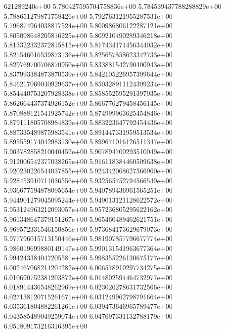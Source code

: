 621289240e+00	5.780427595704758836e+00	5.784539437788288829e+00	5.788651279871758426e+00	5.792763121955287531e+00	5.796874964038817524e+00	5.800986806122287121e+00	5.805098648205816225e+00	5.809210490289346218e+00	5.813322332372815815e+00	5.817434174456344032e+00	5.821546016539873136e+00	5.825657858623342733e+00	5.829769700706870950e+00	5.833881542790400943e+00	5.837993384873870539e+00	5.842105226957399644e+00	5.846217069040929637e+00	5.850328911124399234e+00	5.854440753207928338e+00	5.858552595291397935e+00	5.862664437374926152e+00	5.866776279458456145e+00	5.870888121541925742e+00	5.874999963625454846e+00	5.879111805708984839e+00	5.883223647792454436e+00	5.887335489875983541e+00	5.891447331959513534e+00	5.895559174042983130e+00	5.899671016126511347e+00	5.903782858210040452e+00	5.907894700293510049e+00	5.912006542377038265e+00	5.916118384460509638e+00	5.920230226544037855e+00	5.924342068627566960e+00	5.928453910711036556e+00	5.932565752794566549e+00	5.936677594878095654e+00	5.940789436961565251e+00	5.944901279045095244e+00	5.949013121128622572e+00	5.953124963212093057e+00	5.957236805295622162e+00	5.961348647379151267e+00	5.965460489462621751e+00	5.969572331546150856e+00	5.973684173629679073e+00	5.977796015713150446e+00	5.981907857796677774e+00	5.986019699880149147e+00	5.990131541963677364e+00	5.994243384047205581e+00	5.998355226130675177e+00	6.002467068214204282e+00	6.006578910297734275e+00	6.010690752381203872e+00	6.014802594464732977e+00	6.018914436548262969e+00	6.023026278631732566e+00	6.027138120715261671e+00	6.031249962798791664e+00	6.035361804882261261e+00	6.039473646965789477e+00	6.043585489049259074e+00	6.047697331132788179e+00	6.051809173216316395e+00
